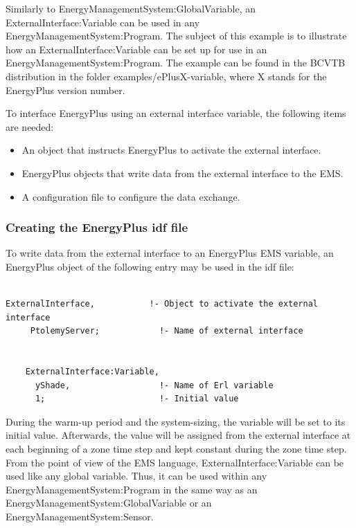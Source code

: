 Similarly to EnergyManagementSystem:GlobalVariable, an ExternalInterface:Variable can be used in any EnergyManagementSystem:Program. The subject of this example is to illustrate how an ExternalInterface:Variable can be set up for use in an EnergyManagementSystem:Program. The example can be found in the BCVTB distribution in the folder examples/ePlusX-variable, where X stands for the EnergyPlus version number.

To interface EnergyPlus using an external interface variable, the following items are needed:

\begin{itemize}
\item
  An object that instructs EnergyPlus to activate the external interface.
\item
  EnergyPlus objects that write data from the external interface to the EMS.
\item
  A configuration file to configure the data exchange.
\end{itemize}

\subsubsection{Creating the EnergyPlus idf file}\label{creating-the-energyplus-idf-file-2}

To write data from the external interface to an EnergyPlus EMS variable, an EnergyPlus object of the following entry may be used in the idf file:

\begin{lstlisting}

ExternalInterface,           !- Object to activate the external interface
     PtolemyServer;            !- Name of external interface


    ExternalInterface:Variable,
      yShade,                  !- Name of Erl variable
      1;                       !- Initial value
\end{lstlisting}

During the warm-up period and the system-sizing, the variable will be set to its initial value. Afterwards, the value will be assigned from the external interface at each beginning of a zone time step and kept constant during the zone time step. From the point of view of the EMS language, ExternalInterface:Variable can be used like any global variable. Thus, it can be used within any EnergyManagementSystem:Program in the same way as an EnergyManagementSystem:GlobalVariable or an EnergyManagementSystem:Sensor.

